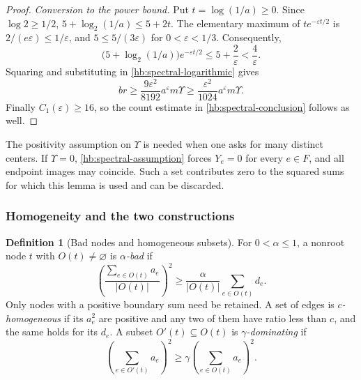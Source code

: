 \documentclass[11pt]{amsart}
\theoremstyle{definition}
\newtheorem{definition}[theorem]{Definition}
\theoremstyle{remark}
\numberwithin{equation}{section}
\begin{document}
\begin{proof}
 
 \emph{Conversion to the power bound.}
Put \(t=\log(1/a)\ge0\).  Since \(\log2\ge1/2\),
\(5+\log_2(1/a)\le5+2t\).
The elementary maximum of \(t e^{-\varepsilon t/2}\) is
\(2/(e\varepsilon)\le1/\varepsilon\), and
\(5\le5/(3\varepsilon)\) for \(0<\varepsilon<1/3\).
Consequently,
\[
 \bigl(5+\log_2(1/a)\bigr)e^{-\varepsilon t/2}
 \le5+\frac2\varepsilon<\frac4\varepsilon.
\]
Squaring and substituting in \eqref{hb:spectral-logarithmic} gives
\[
 br\ge\frac{9\varepsilon^2}{8192}
       a^\varepsilon m\Upsilon
 \ge\frac{\varepsilon^2}{1024}
       a^\varepsilon m\Upsilon.
\]
Finally \(C_1(\varepsilon)\ge16\), so the count estimate in
\eqref{hb:spectral-conclusion} follows as well.
\end{proof}

The positivity assumption on \(\Upsilon\) is needed when one asks for
many distinct centers.  If \(\Upsilon=0\),
\eqref{hb:spectral-assumption} forces \(Y_e=0\) for every \(e\in F\),
and all endpoint images may coincide.  Such a set contributes zero to
the squared sums for which this lemma is used and can be discarded.


\subsubsection{Homogeneity and the two constructions}

\begin{definition}[Bad nodes and homogeneous subsets]\label{hb:bad}
For $0<\alpha\le1$, a nonroot node $t$ with $O(t)\ne\varnothing$
is \emph{$\alpha$-bad} if
\[
 \left(\frac{\sum_{e\in O(t)}a_e}{|O(t)|}\right)^2
 \ge\frac{\alpha}{|O(t)|}\sum_{e\in O(t)}d_e.
\]
Only nodes with a positive boundary sum need be retained.
A set of edges is \emph{$c$-homogeneous} if its $a_e^2$ are positive
and any two of them have ratio less than $c$, and the same holds for
its $d_e$.  A subset $O'(t)\subseteq O(t)$ is
\emph{$\gamma$-dominating} if
\[
 \left(\sum_{e\in O'(t)}a_e\right)^2
 \ge\gamma\left(\sum_{e\in O(t)}a_e\right)^2.
\]
\end{definition}
\end{document}
